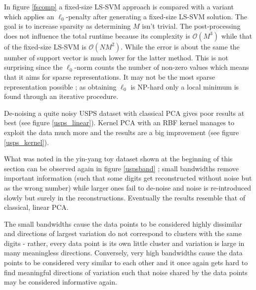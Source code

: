 \par In figure \ref{fscomp} a fixed-size LS-SVM approach is compared with a variant which applies an $\ell_0$-penalty after generating a fixed-size LS-SVM solution. The goal is to increase sparsity as determining $M$ isn't trivial. The post-processing does not influence the total runtime because its complexity is $\mathcal{O}(M^3)$ while that of the fixed-size LS-SVM is $\mathcal{O}(NM^2)$. While the error is about the same the number of support vector is much lower for the latter method. This is not surprising since the $\ell_0$-norm counts the number of non-zero values which means that it aims for sparse representations. It may not be the most sparse representation possible ; as obtaining $\ell_0$ is NP-hard only a local minimum is found through an iterative procedure.


De-noising a quite noisy USPS dataset with classical PCA gives poor results at best (see figure \ref{usps_linear}). Kernel PCA with an RBF kernel manages to exploit the data much more and the results are a big improvement (see figure \ref{usps_kernel}).

\endgroup

What was noted in the yin-yang toy dataset shown at the beginning of this section can be observed again in figure \ref{uspsband} ; small bandwidths remove important information (such that some digits get reconstructed without noise but as the wrong number) while larger ones fail to de-noise and noise is re-introduced slowly but surely in the reconstructions. Eventually the results resemble that of classical, linear PCA.

\par The small bandwidths cause the data points to be considered highly dissimilar and directions of largest variation do not correspond to clusters with the same digits - rather, every data point is its own little cluster and variation is large in many meaningless directions. Conversely, very high bandwidths cause the data points to be considered very similar to each other and it once again gets hard to find meaningful directions of variation such that noise shared by the data points may be considered informative again.

